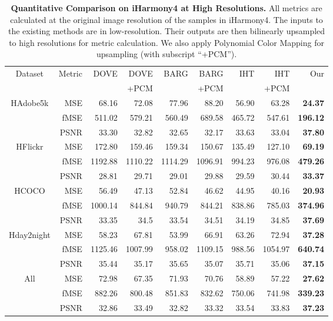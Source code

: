 \documentclass[runningheads]{llncs}
\begin{document}
\begin{table*}[ht]
  \begin{center}
    \caption{\textbf{Quantitative Comparison on iHarmony4 at High Resolutions.} All metrics are calculated at the original image resolution of the samples in iHarmony4. 
    The inputs to the existing methods are in low-resolution. Their outputs are then bilinearly upsampled to high resolutions for metric calculation. 
    We also apply Polynomial Color Mapping for upsampling (with subscript ``+PCM'').
}\label{tab:highresolution}
\setlength{\tabcolsep}{3pt}
\scriptsize
\begin{tabular}{c|r|rrrrrr|r}
\toprule
Dataset & Metric & DOVE\cite{DoveNet} & DOVE\cite{DoveNet} & BARG\cite{BargainNet} & BARG\cite{BargainNet} & IHT\cite{TransformerIH} & IHT\cite{TransformerIH} & \;\;\;\;\;\;\;\;Our \\
& & & +PCM & & +PCM & & +PCM & \\
\midrule
\multirow{3}{*}{HAdobe5k}
& MSE  &  68.16 &  72.08 &  77.96 &  88.20 &  56.90 &  63.28 &  \textbf{24.37} \\
& fMSE & 511.02 & 579.21 & 560.49 & 689.58 & 465.72 & 547.61 & \textbf{196.12} \\
& PSNR   &  33.30 &  32.82 &  32.65 &  32.17 &  33.63 &  33.04 &  \textbf{37.80} \\
\midrule
\multirow{3}{*}{HFlickr}
& MSE  & 172.80 & 159.46 & 159.34 & 150.67 & 135.49 & 127.10 &  \textbf{69.19} \\
& fMSE &1192.88 &1110.22 &1114.29 &1096.91 & 994.23 & 976.08 & \textbf{479.26} \\
& PSNR   &  28.81 &  29.71 &  29.01 &  29.88 &  29.59 &  30.44 &  \textbf{33.37} \\
\midrule
\multirow{3}{*}{HCOCO}
& MSE  &  56.49 &  47.13 &  52.84 &  46.62 &  44.95 &  40.16 &  \textbf{20.93} \\
& fMSE &1000.14 & 844.84 & 940.79 & 844.21 & 838.86 & 785.03 & \textbf{374.96} \\
& PSNR   &  33.35 &  34.5 &  33.54 &   34.51 &  34.19 &  34.85 &  \textbf{37.69} \\
\midrule
\multirow{3}{*}{Hday2night}
& MSE  &  58.23 &  67.81 &  53.99 &  66.91 &  63.26 &  72.94 &  \textbf{37.28} \\
& fMSE &1125.46 &1007.99 & 958.02 &1109.15 & 988.56 &1054.97 & \textbf{640.74} \\
& PSNR   &  35.44 &  35.17 &  35.65 &  35.07 &  35.71 &  35.06 &  \textbf{37.15} \\
\midrule
\multirow{3}{*}{All}
& MSE  &  72.98 &  67.35 &  71.93 &  70.76 &  58.89 &  57.22 &  \textbf{27.62} \\
& fMSE & 882.26 & 800.48 & 851.83 & 832.62 & 750.06 & 741.98 & \textbf{339.23} \\
& PSNR   &  32.86 &  33.49 &  32.82 &  33.32 &  33.54 &  33.83 &  \textbf{37.23} \\
\bottomrule
\end{tabular}
\vspace{-0.2cm}
\end{center}
\end{table*}
\end{document}
